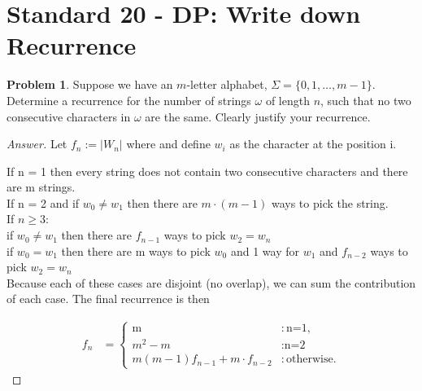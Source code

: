 \documentclass[11pt]{article}
\theoremstyle{definition}
\theoremstyle{definition}
\newtheorem{required}{Problem}
\theoremstyle{definition}
\begin{document}
\newpage
\section{Standard 20 - DP: Write down Recurrence}

\begin{required}
Suppose we have an $m$-letter alphabet, $\Sigma = \{0, 1, \ldots, m-1\}$. Determine a recurrence for the number of strings $\omega$ of length $n$, such that no two consecutive characters in $\omega$ are the same. Clearly justify your recurrence.
\end{required}

\begin{proof}[Answer]
 Let $f_{n} := |W_{n}|$ where and define $w_i$ as the character at the position i.

If n = 1 then every string does not contain two consecutive characters and there are m strings.\\

If n = 2 and if $w_0 \ne w_1$ then there are $m\cdot(m-1)$ ways to pick the string. \\
If $n \ge 3$: \\
if $w_0 \ne w_1$ then there are $f_{n-1}$ ways to pick $w_2 = w_n$ \\
if $w_0 = w_1$ then there are m ways to pick $w_0$ and 1 way for $w_1$ and $f_{n-2}$ ways to pick $w_2 = w_n$ \\
Because each of these cases are disjoint (no overlap), we can sum the contribution of each case. The final
recurrence is then

\begin{align*}
f_{n} &= \begin{cases}
\text{m} & : \text{n=1}, \\
\text{$m^2-m$} & : \text{n=2}\\
\text{$m(m-1)f_{n-1}+m\cdot f_{n-2}$} & : \text{otherwise}. 
\end{cases}
\end{align*}


\end{proof}


\begin{comment}

\end{comment}

\end{document}
